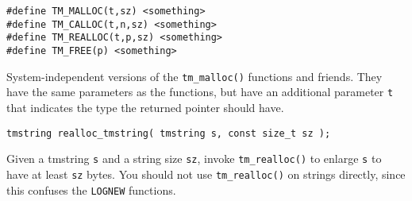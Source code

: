 \begin{verbatim}
#define TM_MALLOC(t,sz) <something>
#define TM_CALLOC(t,n,sz) <something>
#define TM_REALLOC(t,p,sz) <something>
#define TM_FREE(p) <something>
\end{verbatim}
\begin{desc}
System-independent versions of the \verb+tm_malloc()+ functions and
friends.
They have the same parameters as the functions, but have an additional
parameter \verb+t+ that indicates the type the returned pointer
should have.
\end{desc}
\begin{verbatim}
tmstring realloc_tmstring( tmstring s, const size_t sz );
\end{verbatim}
\begin{desc}
Given a tmstring \verb+s+ and a string size \verb+sz+,
invoke \verb+tm_realloc()+ to enlarge \verb+s+ to have at least
\verb+sz+ bytes.
You should not use \verb+tm_realloc()+ on strings directly,
since this confuses the \verb+LOGNEW+ functions.
\end{desc}
